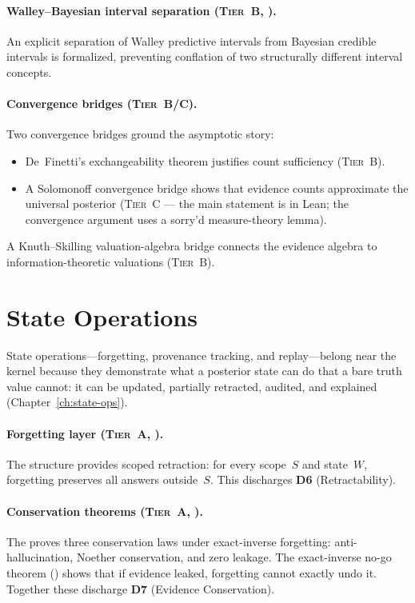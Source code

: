 \paragraph{Walley--Bayesian interval separation
  (\textsc{Tier~B}, \claimConditional{}).}
An explicit separation of Walley predictive intervals from Bayesian
credible intervals is formalized, preventing conflation of two
structurally different interval concepts.

\paragraph{Convergence bridges (\textsc{Tier~B/C}).}
Two convergence bridges ground the asymptotic story:
\begin{itemize}
\item De~Finetti's exchangeability theorem justifies count sufficiency
  (\textsc{Tier~B}).
\item A Solomonoff convergence bridge shows that evidence counts
  approximate the universal posterior (\textsc{Tier~C} --- the main
  statement is in Lean; the convergence argument uses a sorry'd
  measure-theory lemma).
\end{itemize}
A Knuth--Skilling valuation-algebra bridge connects the evidence algebra
to information-theoretic valuations (\textsc{Tier~B}).


\section{State Operations}
\label{sec:covers-state-ops}

State operations---forgetting, provenance tracking, and replay---belong
near the kernel because they demonstrate what a posterior state can do
that a bare truth value cannot: it can be updated, partially retracted,
audited, and explained (Chapter~\ref{ch:state-ops}).

\paragraph{Forgetting layer (\textsc{Tier~A}, \claimCore{}).}
The  structure provides scoped retraction: for
every scope~$S$ and state~$W$, forgetting preserves all answers
outside~$S$.  This discharges \textbf{D6} (Retractability).

\paragraph{Conservation theorems (\textsc{Tier~A}, \claimCore{}).}
The  proves three conservation laws under
exact-inverse forgetting: anti-hallucination, Noether conservation, and
zero leakage.  The exact-inverse no-go theorem (\claimBoundary{}) shows
that if evidence leaked, forgetting cannot exactly undo it.  Together
these discharge \textbf{D7} (Evidence Conservation).

